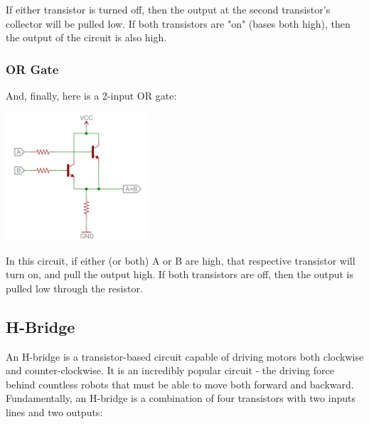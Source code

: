 \documentclass[a4paper, 11pt]{article} %
\begin{document}
If either transistor is turned off, then the output at the second transistor's collector will be pulled low. If both transistors are "on" (bases both high), then the output of the circuit is also high.

\subsubsection*{OR Gate}

And, finally, here is a 2-input OR gate:

\begin{center}
\includegraphics[width=150pt]{tran19}
\end{center}

In this circuit, if either (or both) A or B are high, that respective transistor will turn on, and pull the output high. If both transistors are off, then the output is pulled low through the resistor.

\subsection*{H-Bridge}

An H-bridge is a transistor-based circuit capable of driving motors both clockwise and counter-clockwise. It is an incredibly popular circuit - the driving force behind countless robots that must be able to move both forward and backward.\\

Fundamentally, an H-bridge is a combination of four transistors with two inputs lines and two outputs:
\end{document}
